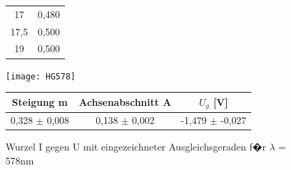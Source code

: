 \documentclass[a4paper, 10pt]{report}%
\begin{document}
\begin{figure}[!htbp]
\begin{minipage}[t]{2cm}
\begin{center}
\begin{tabular}{c|c}
17&	0,480 \\
17,5&	0,500 \\
19&	0,500
\end{tabular}
\end{center}
\end{minipage}
\hfill
\begin{minipage}[t]{12cm}
\vspace{0pt}
\texttt{[image: HG578]}
\caption{Wurzel I gegen U mit eingezeichneter Ausgleichsgeraden f�r $\lambda$ = 578nm}
\begin{center}
\begin{tabular}{c|c|c}
Steigung m & Achsenabschnitt A & $U_g$ [V]\\
\hline
0,328 $\pm$ 0,008 & 0,138 $\pm$	0,002 & -1,479 $\pm$	-0,027
\end{tabular}
\end{center}
\end{minipage}
\end{figure}
	

\newpage
\end{document}
